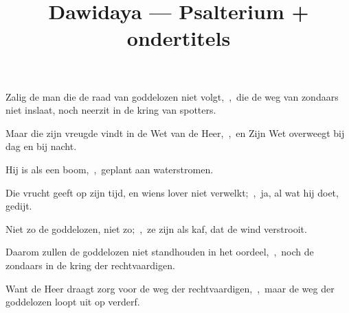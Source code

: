 \documentclass[12pt,twoside,a5paper]{article}
\begin{document}

\title{Dawidaya --- Psalterium + ondertitels}
\author{}
\date{}
\maketitle







\begin{halfparskip}
  Zalig de man die de raad van goddelozen niet volgt,~\sep\ die de weg van zondaars niet inslaat, noch neerzit in de kring van spotters.


  Maar die zijn vreugde vindt in de Wet van de Heer,~\sep\ en Zijn Wet overweegt bij dag en bij nacht.

  Hij is als een boom,~\sep\ geplant aan waterstromen.

  Die vrucht geeft op zijn tijd, en wiens lover niet verwelkt;~\sep\ ja, al wat hij doet, gedijt.
\end{halfparskip}


\begin{halfparskip}
  Niet zo de goddelozen, niet zo;~\sep\ ze zijn als kaf, dat de wind verstrooit.

  Daarom zullen de goddelozen niet standhouden in het oordeel,~\sep\ noch de zondaars in de kring der rechtvaardigen.

  Want de Heer draagt zorg voor de weg der rechtvaardigen,~\sep\ maar de weg der goddelozen loopt uit op verderf.
\end{halfparskip}
\end{document}
